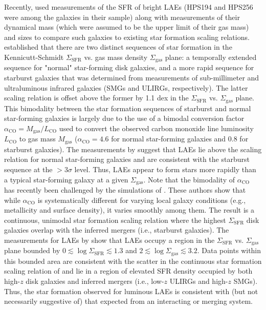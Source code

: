 \documentclass{emulateapj}
\begin{document}
Recently, \citet{rhoads2013} used measurements of the SFR of bright LAEs (HPS194 and HPS256 were among the galaxies in their sample) along with measurements of their dynamical mass (which were assumed to be the upper limit of their gas mass) and sizes to compare such galaxies to existing star formation scaling relations. \citet{daddi2010} established that there are two distinct sequences of star formation in the Kennicutt-Schmidt $\Sigma_{\mathrm{SFR}}$ vs. gas mass density $\Sigma_{\mathrm{gas}}$ plane: a temporally extended sequence for "normal" star-forming disk galaxies, and a more rapid sequence for starburst galaxies that was determined from measurements of sub-millimeter and ultraluminous infrared galaxies (SMGs and ULIRGs, respectively). The latter scaling relation is offset above the former by 1.1 dex in the $\Sigma_{\mathrm{SFR}}$ vs. $\Sigma_{\mathrm{gas}}$ plane. This bimodality between the star formation sequences of starburst and normal star-forming galaxies is largely due to the use of a bimodal conversion factor $\alpha_{\mathrm{CO}} = M_{\mathrm{gas}} / L_{\mathrm{CO}}$ used to convert the observed carbon monoxide line luminosity $L_{\mathrm{CO}}$ to gas mass $M_{\mathrm{gas}}$ ($\alpha_{\mathrm{CO}} = 4.6$ for normal star-forming galaxies and 0.8 for starburst galaxies). The measurements by \citet{rhoads2013} suggest that LAEs lie above the scaling relation for normal star-forming galaxies and are consistent with the \citet{daddi2010} starburst sequence at the $>3\sigma$ level. Thus, LAEs appear to form stars more rapidly than a typical star-forming galaxy at a given $\Sigma_{\mathrm{gas}}$. Note that the bimodality of $\alpha_{\mathrm{CO}}$ has recently been challenged by the simulations of \citet{narayanan2012}. These authors show that while $\alpha_{\mathrm{CO}}$ is systematically different for varying local galaxy conditions (e.g., metallicity and surface density), it varies smoothly among them. The result is a continuous, unimodal star formation scaling relation where the highest $\Sigma_{\mathrm{SFR}}$ disk galaxies overlap with the inferred mergers (i.e., starburst galaxies). The measurements for LAEs by \citet{rhoads2013} show that LAEs occupy a region in the $\Sigma_{\mathrm{SFR}}$ vs. $\Sigma_{\mathrm{gas}}$ plane bounded by $0 \lesssim \log\Sigma_{\mathrm{SFR}} \lesssim 1.3$ and $2 \lesssim \log\Sigma_{\mathrm{gas}} \lesssim 3.2$. Data points within this bounded area are consistent with the scatter in the continuous star formation scaling relation of \citet{narayanan2012} and lie in a region of elevated SFR density occupied by both high-$z$ disk galaxies and inferred mergers (i.e., low-$z$ ULIRGs and high-$z$ SMGs). Thus, the star formation observed for luminous LAEs is consistent with (but not necessarily suggestive of) that expected from an interacting or merging system.
\end{document}
